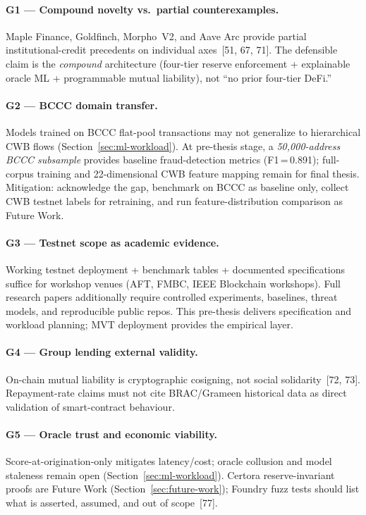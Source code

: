\documentclass[12pt,a4paper]{report}
\begin{document}
\paragraph{G1 --- Compound novelty vs.\ partial counterexamples.}
Maple Finance, Goldfinch, Morpho~V2, and Aave Arc provide partial institutional-credit precedents on individual axes~[51, 67, 71]. The defensible claim is the \textit{compound} architecture (four-tier reserve enforcement + explainable oracle ML + programmable mutual liability), not ``no prior four-tier DeFi.''

\paragraph{G2 --- BCCC domain transfer.}
Models trained on BCCC flat-pool transactions may not generalize to hierarchical CWB flows (Section~\ref{sec:ml-workload}). At pre-thesis stage, a \textit{50{,}000-address BCCC subsample} provides baseline fraud-detection metrics (F1\,=\,0.891); full-corpus training and 22-dimensional CWB feature mapping remain for final thesis. Mitigation: acknowledge the gap, benchmark on BCCC as baseline only, collect CWB testnet labels for retraining, and run feature-distribution comparison as Future Work.

\paragraph{G3 --- Testnet scope as academic evidence.}
Working testnet deployment + benchmark tables + documented specifications suffice for workshop venues (AFT, FMBC, IEEE Blockchain workshops). Full research papers additionally require controlled experiments, baselines, threat models, and reproducible public repos. This pre-thesis delivers specification and workload planning; MVT deployment provides the empirical layer.

\paragraph{G4 --- Group lending external validity.}
On-chain mutual liability is cryptographic cosigning, not social solidarity~[72, 73]. Repayment-rate claims must not cite BRAC/Grameen historical data as direct validation of smart-contract behaviour.

\paragraph{G5 --- Oracle trust and economic viability.}
Score-at-origination-only mitigates latency/cost; oracle collusion and model staleness remain open (Section~\ref{sec:ml-workload}). Certora reserve-invariant proofs are Future Work (Section~\ref{sec:future-work}); Foundry fuzz tests should list what is asserted, assumed, and out of scope~[77].
\end{document}
